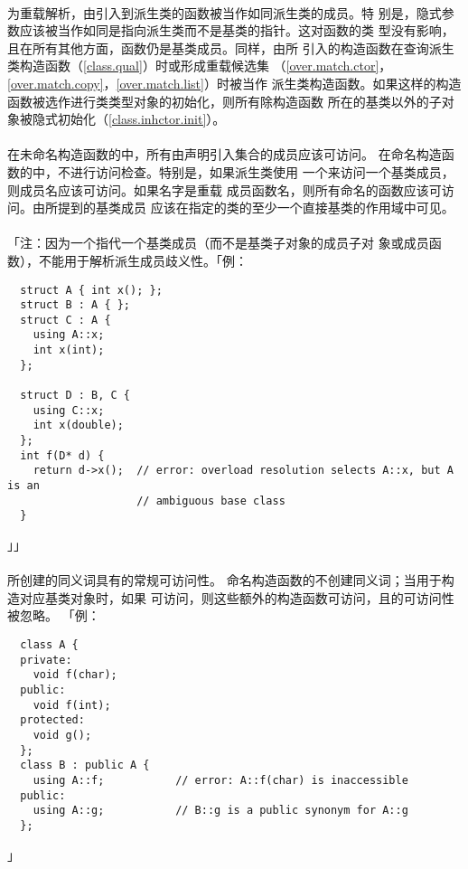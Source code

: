 \paragraph{}
为重载解析，由引入到派生类的函数被当作如同派生类的成员。特
别是，隐式参数应该被当作如同是指向派生类而不是基类的指针。这对函数的类
型没有影响，且在所有其他方面，函数仍是基类成员。同样，由所
引入的构造函数在查询派生类构造函数（\ref{class.qual}）时或形成重载候选集
（\ref{over.match.ctor}，\ref{over.match.copy}，\ref{over.match.list}）时被当作
派生类构造函数。如果这样的构造函数被选作进行类类型对象的初始化，则所有除构造函数
所在的基类以外的子对象被隐式初始化（\ref{class.inhctor.init}）。

\paragraph{}
在未命名构造函数的中，所有由声明引入集合的成员应该可访问。
在命名构造函数的中，不进行访问检查。特别是，如果派生类使用
一个来访问一个基类成员，则成员名应该可访问。如果名字是重载
成员函数名，则所有命名的函数应该可访问。由所提到的基类成员
应该在指定的类的至少一个直接基类的作用域中可见。

\paragraph{}
「注：因为一个指代一个基类成员（而不是基类子对象的成员子对
象或成员函数），不能用于解析派生成员歧义性。「例：
\begin{lstlisting}
  struct A { int x(); };
  struct B : A { };
  struct C : A {
    using A::x;
    int x(int);
  };

  struct D : B, C {
    using C::x;
    int x(double);
  };
  int f(D* d) {
    return d->x();  // error: overload resolution selects A::x, but A is an
                    // ambiguous base class
  }
\end{lstlisting}」」

\paragraph{}
所创建的同义词具有的常规可访问性。
命名构造函数的不创建同义词；当用于构造对应基类对象时，如果
可访问，则这些额外的构造函数可访问，且的可访问性被忽略。
「例：
\begin{lstlisting}
  class A {
  private:
    void f(char);
  public:
    void f(int);
  protected:
    void g();
  };
  class B : public A {
    using A::f;           // error: A::f(char) is inaccessible
  public:
    using A::g;           // B::g is a public synonym for A::g
  };
\end{lstlisting}」

